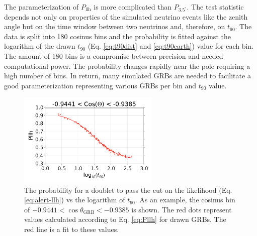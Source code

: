 


The parameterization of $P_\text{llh}$ is more complicated than
$P_{3.5^\circ}$. The test statistic depends not only on properties of the 
simulated neutrino events like the zenith angle
but on the time window 
between two neutrinos and, therefore, on $t_{90}$. The data is split 
into 180 cosinus bins
and the probability is fitted against the logarithm of the drawn $t_{90}$ (Eq.
\ref{eq:t90dist} and \ref{eq:t90earth}) value for each bin. The amount of 180 
bins is a compromise between precision and needed computational power. The 
probability changes rapidly near the pole requiring a high 
number of bins. In return, many simulated GRBs are needed to facilitate a good 
parameterization representing various GRBs per bin and $t_{90}$ value.

\begin{figure}[h]
 \centering
 \captionsetup{width=0.6\textwidth}
\includegraphics[width=0.6\textwidth]{fig/Pllh_example_g2_bdt.pdf}

\caption{The probability for a doublet to pass 
the cut on the likelihood (Eq. 
\ref{eq:alert-llh}) vs the logarithm of 
$t_{90}$. As an example, the cosinus bin of $-0.9441 < \cos \theta_\text{GRB} 
< -0.9385$ is shown. The red dots represent values calculated according to Eq. 
\ref{eq:Pllh} for drawn GRBs. The red line is a fit to these values. 
\label{fig:Pllh_example_g2_bdt}}
\end{figure}

